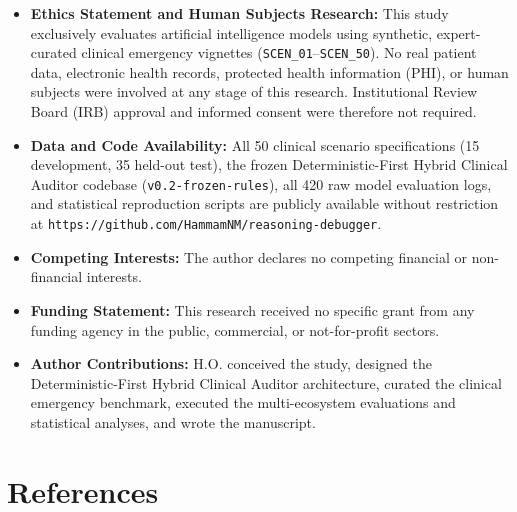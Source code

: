 \documentclass[10pt,a4paper]{article}
\begin{document}
\begin{itemize}
  \item \textbf{Ethics Statement and Human Subjects Research:} This study exclusively evaluates artificial intelligence models using synthetic, expert-curated clinical emergency vignettes (\texttt{SCEN\_01}--\texttt{SCEN\_50}). No real patient data, electronic health records, protected health information (PHI), or human subjects were involved at any stage of this research. Institutional Review Board (IRB) approval and informed consent were therefore not required.
  \item \textbf{Data and Code Availability:} All 50 clinical scenario specifications (15 development, 35 held-out test), the frozen Deterministic-First Hybrid Clinical Auditor codebase (\texttt{v0.2-frozen-rules}), all 420 raw model evaluation logs, and statistical reproduction scripts are publicly available without restriction at \texttt{https://github.com/HammamNM/reasoning-debugger}.
  \item \textbf{Competing Interests:} The author declares no competing financial or non-financial interests.
  \item \textbf{Funding Statement:} This research received no specific grant from any funding agency in the public, commercial, or not-for-profit sectors.
  \item \textbf{Author Contributions:} H.O. conceived the study, designed the Deterministic-First Hybrid Clinical Auditor architecture, curated the clinical emergency benchmark, executed the multi-ecosystem evaluations and statistical analyses, and wrote the manuscript.
\end{itemize}


\section*{References}
\end{document}
